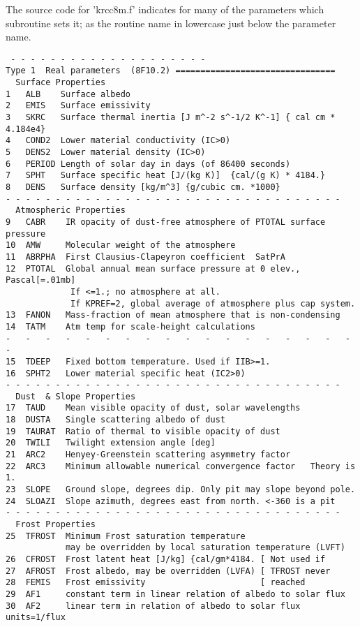 \documentclass{article}
\begin{document}
The source code for 'krcc8m.f' indicates for many of the parameters which
subroutine sets it; as the routine name in lowercase just below the parameter
name.
\vspace{-3.mm} 
\begin{verbatim} 
 - - - - - - - - - - - - - - - - - - - -
Type 1	Real parameters  (8F10.2) ================================
  Surface Properties
1   ALB    Surface albedo
2   EMIS   Surface emissivity
3   SKRC   Surface thermal inertia [J m^-2 s^-1/2 K^-1] { cal cm * 4.184e4}
4   COND2  Lower material conductivity (IC>0)
5   DENS2  Lower material density (IC>0)
6   PERIOD Length of solar day in days (of 86400 seconds)
7   SPHT   Surface specific heat [J/(kg K)]  {cal/(g K) * 4184.}
8   DENS   Surface density [kg/m^3] {g/cubic cm. *1000}
- - - - - - - - - - - - - - - - - - - - - - - - - - - - - - - - - - 
  Atmospheric Properties
9   CABR    IR opacity of dust-free atmosphere of PTOTAL surface pressure
10  AMW     Molecular weight of the atmosphere
11  ABRPHA  First Clausius-Clapeyron coefficient  SatPrA 
12  PTOTAL  Global annual mean surface pressure at 0 elev., Pascal[=.01mb]
             If <=1.; no atmosphere at all.
             If KPREF=2, global average of atmosphere plus cap system.
13  FANON   Mass-fraction of mean atmosphere that is non-condensing
14  TATM    Atm temp for scale-height calculations
-   -   -   -   -   -   -   -   -   -   -   -   -   -   -   -   -   -   -   
15  TDEEP   Fixed bottom temperature. Used if IIB>=1.
16  SPHT2   Lower material specific heat (IC2>0)
- - - - - - - - - - - - - - - - - - - - - - - - - - - - - - - - - - 
  Dust  & Slope Properties
17  TAUD    Mean visible opacity of dust, solar wavelengths
18  DUSTA   Single scattering albedo of dust
19  TAURAT  Ratio of thermal to visible opacity of dust
20  TWILI   Twilight extension angle [deg]
21  ARC2    Henyey-Greenstein scattering asymmetry factor
22  ARC3    Minimum allowable numerical convergence factor   Theory is 1.
23  SLOPE   Ground slope, degrees dip. Only pit may slope beyond pole.
24  SLOAZI  Slope azimuth, degrees east from north. <-360 is a pit
- - - - - - - - - - - - - - - - - - - - - - - - - - - - - - - - - - 
  Frost Properties
25  TFROST  Minimum Frost saturation temperature
            may be overridden by local saturation temperature (LVFT)
26  CFROST  Frost latent heat [J/kg] {cal/gm*4184. [ Not used if
27  AFROST  Frost albedo, may be overridden (LVFA) [ TFROST never
28  FEMIS   Frost emissivity                       [ reached
29  AF1     constant term in linear relation of albedo to solar flux
30  AF2     linear term in relation of albedo to solar flux units=1/flux

\end{verbatim}
\end{document}
